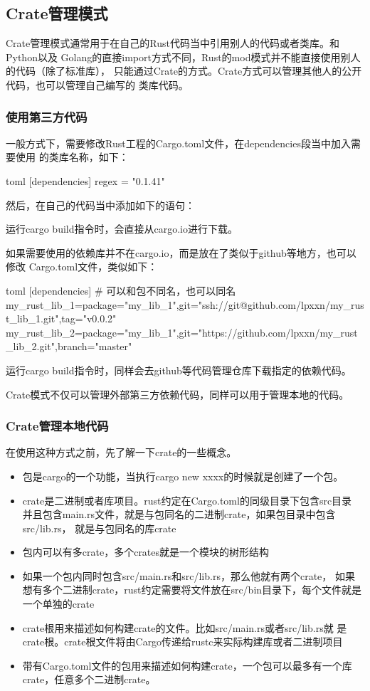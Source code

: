 \subsection{Crate管理模式}
Crate管理模式通常用于在自己的Rust代码当中引用别人的代码或者类库。和Python以及
Golang的直接import方式不同，Rust的mod模式并不能直接使用别人的代码（除了标准库），
只能通过Crate的方式。Crate方式可以管理其他人的公开代码，也可以管理自己编写的
类库代码。

\subsubsection{使用第三方代码}
一般方式下，需要修改Rust工程的Cargo.toml文件，在dependencies段当中加入需要使用
的类库名称，如下：
\begin{code-block}{toml}
[dependencies]
regex = "0.1.41"
\end{code-block}
然后，在自己的代码当中添加如下的语句：
运行cargo build指令时，会直接从cargo.io进行下载。

如果需要使用的依赖库并不在cargo.io，而是放在了类似于github等地方，也可以修改
Cargo.toml文件，类似如下：
\begin{code-block}{toml}
[dependencies]
# 可以和包不同名，也可以同名
my_rust_lib_1={package="my_lib_1",git="ssh://git@github.com/lpxxn/my_rust_lib_1.git",tag="v0.0.2"}
my_rust_lib_2={package="my_lib_1",git="https://github.com/lpxxn/my_rust_lib_2.git",branch="master"}
\end{code-block}
运行cargo build指令时，同样会去github等代码管理仓库下载指定的依赖代码。

Crate模式不仅可以管理外部第三方依赖代码，同样可以用于管理本地的代码。

\subsubsection{Crate管理本地代码}
在使用这种方式之前，先了解一下crate的一些概念。
\begin{itemize}
  \item 包是cargo的一个功能，当执行cargo new xxxx的时候就是创建了一个包。
  \item crate是二进制或者库项目。rust约定在Cargo.toml的同级目录下包含src目录
并且包含main.rs文件，就是与包同名的二进制crate，如果包目录中包含src/lib.rs，
就是与包同名的库crate
  \item 包内可以有多crate，多个crates就是一个模块的树形结构
  \item 如果一个包内同时包含src/main.rs和src/lib.rs，那么他就有两个crate，
如果想有多个二进制crate，rust约定需要将文件放在src/bin目录下，每个文件就是
一个单独的crate
  \item crate根用来描述如何构建crate的文件。比如src/main.rs或者src/lib.rs就
是crate根。crate根文件将由Cargo传递给rustc来实际构建库或者二进制项目
  \item 带有Cargo.toml文件的包用来描述如何构建crate，一个包可以最多有一个库
crate，任意多个二进制crate。
\end{itemize}

